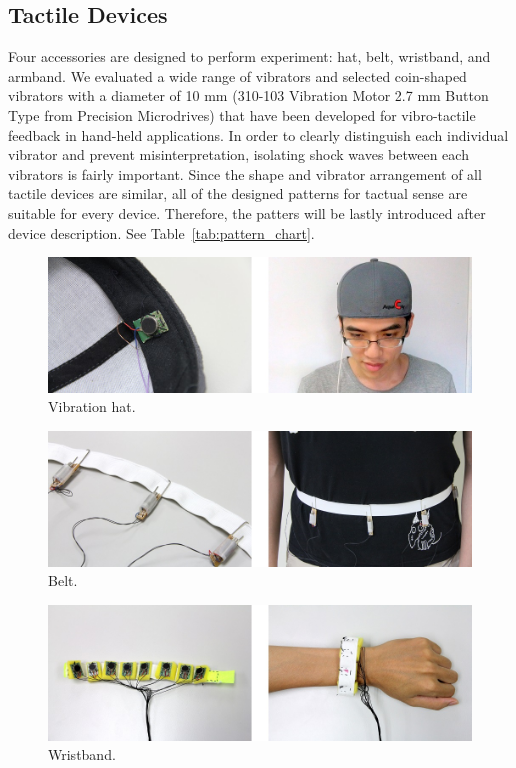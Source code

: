 \documentclass{sigchi}
\begin{document}
\subsection{Tactile Devices}
Four accessories are designed to perform experiment: hat, belt, wristband, and armband. 
We evaluated a wide range of vibrators and selected coin-shaped vibrators with a diameter of 10 mm (310-103 Vibration Motor 2.7 mm Button Type from Precision Microdrives) that have been developed for vibro-tactile feedback in hand-held applications. In order to clearly distinguish each individual vibrator and prevent misinterpretation, isolating shock waves between each vibrators is fairly important. Since the shape and vibrator arrangement of all tactile devices are similar, all of the designed patterns for tactual sense are suitable for every device. Therefore, the patters will be lastly introduced after device description. See Table~\ref{tab:pattern_chart}.

\begin{figure}[!b]
\centering
\includegraphics[width=0.9\columnwidth]{hat_4}
\caption{Vibration hat.}
\label{fig:hat}
\end{figure}

\begin{figure}[!b]
\centering
\includegraphics[width=0.9\columnwidth]{belt_4}
\caption{Belt.}
\label{fig:belt}
\end{figure}

\begin{figure}[!b]
\centering
\includegraphics[width=0.9\columnwidth]{wristband_4}
\caption{Wristband.}
\label{fig:wristband}
\end{figure}
\end{document}
